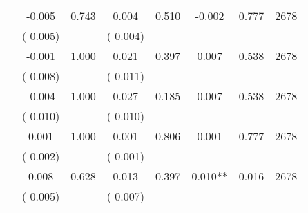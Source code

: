 \begin{tabular}{l*{7}{c}}
        &             -0.005       &        0.743  &              0.004       &        0.510  &             -0.002       &              0.777 &  2678 \\ 
                       &       (       0.005)             &                               &       (       0.004)                     &                               &                                               &                                &                      \\ 

        &             -0.001       &        1.000  &              0.021       &        0.397  &              0.007       &              0.538 &  2678 \\ 
                       &       (       0.008)             &                               &       (       0.011)                     &                               &                                               &                                &                      \\ 

        &             -0.004       &        1.000  &              0.027       &        0.185  &              0.007       &              0.538 &  2678 \\ 
                       &       (       0.010)             &                               &       (       0.010)                     &                               &                                               &                                &                      \\ 

        &              0.001       &        1.000  &              0.001       &        0.806  &              0.001       &              0.777 &  2678 \\ 
                       &       (       0.002)             &                               &       (       0.001)                     &                               &                                               &                                &                      \\ 

        &              0.008       &        0.628  &              0.013       &        0.397  &              0.010**       &              0.016 &  2678 \\ 
                       &       (       0.005)             &                               &       (       0.007)                     &                               &                                               &                                &                      \\ 


\end{tabular}
